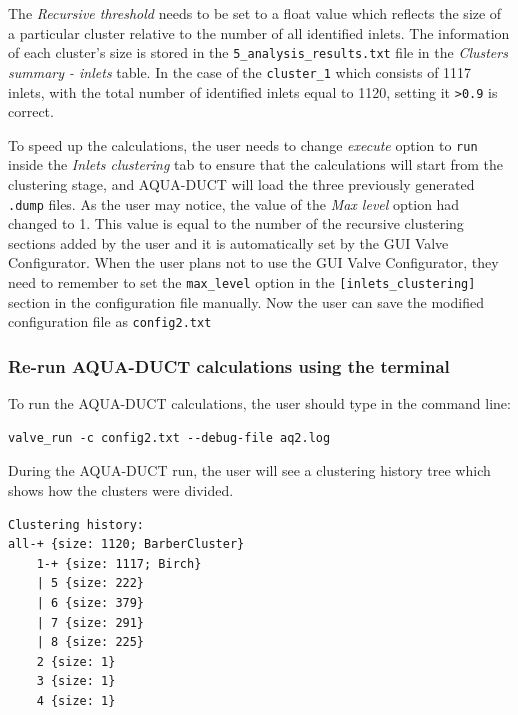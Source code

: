 \documentclass[9pt,tutorial, pubversion]{livecoms}
\begin{document}
The \emph{Recursive threshold} needs to be set to a float value which reflects the size of a particular cluster relative to the number of all identified inlets. The information of each cluster's size is stored in the \texttt{5\_analysis\_results.txt} file in the \emph{Clusters summary - inlets} table. In the case of the \texttt{cluster\_1} which consists of 1117 inlets, with the total number of identified inlets equal to 1120, setting it \texttt{>0.9} is correct.

To speed up the calculations, the user needs to change \textit{execute} option to \texttt{run} inside the \textit{Inlets clustering} tab to ensure that the calculations will start from the clustering stage, and AQUA-DUCT will load the three previously generated \texttt{.dump} files. As the user may notice, the value of the \emph{Max level} option had changed to 1. This value is equal to the number of the recursive clustering sections added by the user and it is automatically set by the GUI Valve Configurator. When the user plans not to use the GUI Valve Configurator, they need to remember to set the \texttt{max\_level} option in the \texttt{[inlets\_clustering]} section in the configuration file manually. Now the user can save the modified configuration file as \texttt{config2.txt}

\subsubsection{Re-run AQUA-DUCT calculations using the terminal}
To run the AQUA-DUCT calculations, the user should type in the command line:
\begin{lstlisting}[columns=fullflexible]
valve_run -c config2.txt --debug-file aq2.log
\end{lstlisting}

During the AQUA-DUCT run, the user will see a clustering history tree which shows how the clusters were divided.
\begin{lstlisting}
Clustering history:
all-+ {size: 1120; BarberCluster}
    1-+ {size: 1117; Birch}
    | 5 {size: 222}
    | 6 {size: 379}
    | 7 {size: 291}
    | 8 {size: 225}
    2 {size: 1}
    3 {size: 1}
    4 {size: 1}
\end{lstlisting}
\end{document}
